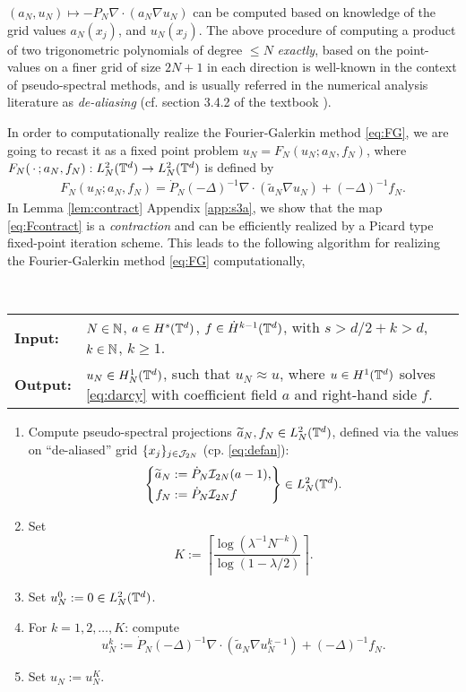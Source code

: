 \documentclass[reqno,a4paper]{amsart}
\begin{document}
$(a_N, u_N) 
\mapsto
-P_N \nabla \cdot \left( a_N \nabla u_N \right)
$
can be computed based on knowledge of the grid values $a_N(x_j)$, and $u_N(x_j)$. The above procedure of computing a product of two trigonometric polynomials of degree $\le N$ \emph{exactly}, based on the point-values on a finer grid of size $2N+1$ in each direction is well-known in the context of pseudo-spectral methods, and is usually referred in the numerical analysis literature as \emph{de-aliasing} (cf. section 3.4.2 of the textbook \cite{Canuto2007}).

In order to computationally realize the Fourier-Galerkin method \eqref{eq:FG}, we are going to recast it as a fixed point problem $u_N = F_N(u_N;a_N,f_N)$, where $F_N({\,\cdot\,};a_N,f_N): L^2_N(\mathbb{T}^d) \to L^2_N(\mathbb{T}^d)$ is defined by
\begin{align} \label{eq:Fcontract}
F_N(u_N;a_N,f_N) 
= 
\dot{P}_N(-\Delta)^{-1} \nabla \cdot \left( \tilde{a}_N \nabla u_N\right) + (-\Delta)^{-1} f_N.
\end{align}
In Lemma \ref{lem:contract} Appendix \ref{app:s3a}, we show that the map \eqref{eq:Fcontract} is a \emph{contraction} and can be efficiently realized by a Picard type fixed-point iteration scheme. This leads to the following algorithm for realizing the Fourier-Galerkin method \eqref{eq:FG} computationally, 
\begin{algorithm} \label{alg:darcy}
\phantom{a} \\
\begin{tabular}{lp{}}
\textbf{Input:} & $N\in \mathbb{N}$, $a \in H^s(\mathbb{T}^d)$, $f \in \dot{H}^{k-1}(\mathbb{T}^d)$, with $s>d/2+k>d$, $k\in \mathbb{N}$, $k\ge 1$.
\\
\textbf{Output:} & 
$u_N \in H^1_N(\mathbb{T}^d)$, such that $u_N \approx u$, where $u \in H^1(\mathbb{T}^d)$ solves \eqref{eq:darcy} with coefficient field $a$ and right-hand side $f$.
\end{tabular}

\begin{enumerate}
\item Compute pseudo-spectral projections $\widetilde{a}_N, f_N\in L^2_N(\mathbb{T}^d)$, defined via the values on ``de-aliased'' grid $\{x_j\}_{j\in \mathcal{J}_{2N}}$ (cp. \eqref{eq:defan}):
\begin{align*}
\left\{
\begin{aligned}
\widetilde{a}_N &:= \dot{P}_N \mathcal{I}_{2N} (a-1), \\
f_N &:= \dot{P}_N \mathcal{I}_{2N} f
\end{aligned} 
\right\}
\in L^2_N(\mathbb{T}^d).
\end{align*}
\item Set 
\[
K := 
\left\lceil
\frac{\log\left(\lambda^{-1} N^{-k}\right)}{\log\left(1-\lambda/2\right)}
\right\rceil.
\]
\item Set $u_N^0 := 0\in L^2_N(\mathbb{T}^d)$.
\item For $k=1,2,\dots, K$: compute
\[
u_N^k  
:= 
\dot{P}_N (-\Delta)^{-1} \nabla \cdot \left( \tilde{a}_N \nabla u_N^{k-1} \right)
+
(-\Delta)^{-1} f_N.
\]
\item Set $u_N := u^K_N$.
\end{enumerate}
\end{algorithm}
\end{document}
